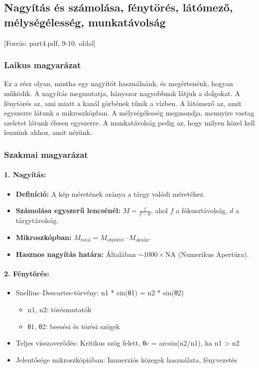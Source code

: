 \documentclass[a4paper,12pt]{article}
\begin{document}
\subsection{Nagyítás és számolása, fénytörés, látómező, mélységélesség, munkatávolság} [Forrás: part4.pdf, 9-10. oldal]

\subsubsection{Laikus magyarázat} Ez a rész olyan, mintha egy nagyítót használnánk, és megértenénk, hogyan működik. A nagyítás megmutatja, hányszor nagyobbnak látjuk a dolgokat. A fénytörés az, ami miatt a kanál görbének tűnik a vízben. A látómező az, amit egyszerre látunk a mikroszkópban. A mélységélesség megmondja, mennyire vastag szeletet látunk élesen egyszerre. A munkatávolság pedig az, hogy milyen közel kell lennünk ahhoz, amit nézünk.

\subsubsection{Szakmai magyarázat}

\paragraph{1. Nagyítás:} 
\begin{itemize}
    \item \textbf{Definíció:} A kép méretének aránya a tárgy valódi méretéhez.
    \item \textbf{Számolása egyszerű lencsénél:} \( M = \frac{f}{f - d} \), ahol \( f \) a fókusztávolság, \( d \) a tárgytávolság.
    \item \textbf{Mikroszkópban:} \( M_{\text{total}} = M_{\text{objektív}} \cdot M_{\text{okulár}} \).
    \item \textbf{Hasznos nagyítás határa:} Általában \(\sim 1000 \times \text{NA}\) (Numerikus Apertúra).
\end{itemize}

\paragraph{2. Fénytörés:} \begin{itemize} \item Snellius–Descartes-törvény: n1 * sin(θ1) = n2 * sin(θ2) \begin{itemize} \item n1, n2: törésmutatók \item θ1, θ2: beesési és törési szögek \end{itemize} \item Teljes visszaverődés: Kritikus szög felett, θc = arcsin(n2/n1), ha n1 > n2 \item Jelentősége mikroszkópiában: Immerziós közegek használata, fényvezetés \end{itemize}
\end{document}
